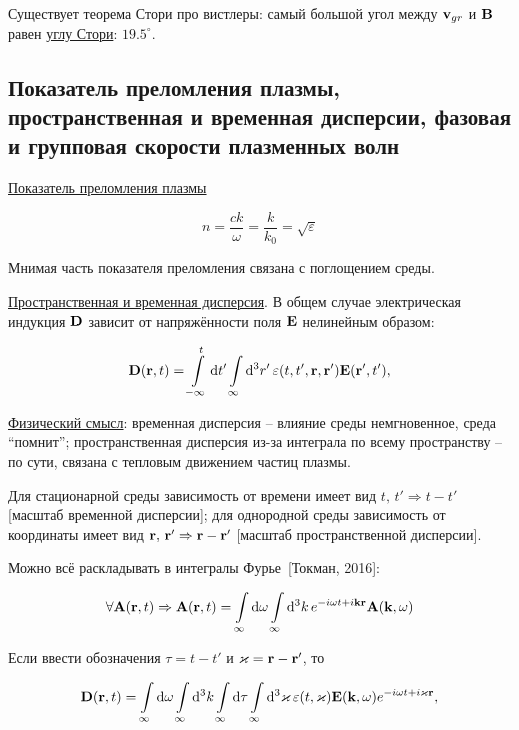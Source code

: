 \documentclass[10pt, a4paper]{article}
\newcommand{\Tokman}{~[Токман, 2016]}
\begin{document}
Существует теорема Стори про вистлеры: самый большой угол между $\vb{v}_{gr}$ и $\vb{B}$ равен \uline{углу Стори}: $19.5^\circ$.

\subsection{Показатель преломления плазмы, пространственная и временная дисперсии, фазовая и групповая скорости плазменных волн}
\label{subsec:refractive_index}

\uline{Показатель преломления плазмы}

\begin{equation*}
	n = \frac{ck}{\omega} = \frac{k}{k_0} = \sqrt{\varepsilon}
\end{equation*}

Мнимая часть показателя преломления связана с поглощением среды.

\uline{Пространственная и временная дисперсия}. В общем случае электрическая индукция $\vb{D}$ зависит от напряжённости поля $\vb{E}$ нелинейным образом:

\begin{equation*}
    \vb{D}(\vb{r}, t) = \int\limits_{-\infty}^{t}\dd{t'} \int\limits_{\infty}\dd[3]{r'}\varepsilon(t, t',\vb{r},\vb{r}') \vb{E}(\vb{r}', t'),
\end{equation*}

\uline{Физический смысл}: временная дисперсия -- влияние среды немгновенное, среда ``помнит''; пространственная дисперсия из-за интеграла по всему пространству -- по сути, связана с тепловым движением частиц плазмы.

Для стационарной среды зависимость от времени имеет вид $t,\,t'\Rightarrow t-t'$ [масштаб временной дисперсии]; для однородной среды зависимость от координаты имеет вид $\vb{r},\,\vb{r}'\Rightarrow \vb{r}-\vb{r}'$ [масштаб пространственной дисперсии].

Можно всё раскладывать в интегралы Фурье\Tokman:

\begin{equation*}
	\forall \vb{A}(\vb{r},t)\Rightarrow \vb{A}(\vb{r},t)=\int\limits_{\infty}\dd{\omega} \int\limits_{\infty}\dd[3]{k}e^{-i\omega t+i\vb{k}\vb{r}}\vb{A}(\vb{k},\omega)
\end{equation*}

Если ввести обозначения $\tau=t-t'$ и $\vb{\varkappa} = \vb{r}-\vb{r}'$, то

\begin{equation*}
	\vb{D}(\vb{r}, t) = \int\limits_{\infty} \dd{\omega} \int\limits_{\infty} \dd[3]{k} \int\limits_{\infty} \dd{\tau} \int\limits_{\infty} \dd[3]{\varkappa} \varepsilon(t, \vb{\varkappa}) \vb{E}(\vb{k}, \omega) e^{-i\omega t+ i\vb{\varkappa}\vb{r}},
\end{equation*}
\end{document}
